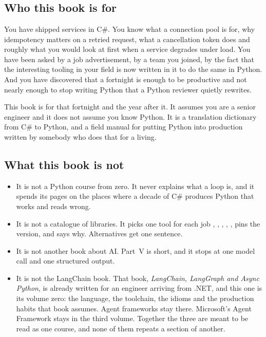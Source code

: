 \chapter*{\lblIntroduction}
{}
\markboth{\lblIntroduction}{\lblIntroduction}

\section*{Who this book is for}

You have shipped services in C\#. You know what a connection pool is for, why
idempotency matters on a retried request, what a cancellation token does and
roughly what you would look at first when a service degrades under load. You
have been asked \dash{} by a job advertisement, by a team you joined, by the
fact that the interesting tooling in your field is now written in it \dash{}
to do the same in Python. And you have discovered that a fortnight is enough to
be productive and not nearly enough to stop writing Python that a Python
reviewer quietly rewrites.

This book is for that fortnight and the year after it. It assumes you are a
senior engineer and it does not assume you know Python. It is a translation
dictionary from C\# to Python, and a field manual for putting Python into
production written by somebody who does that for a living.

\section*{What this book is not}

\begin{itemize}[leftmargin=1.4em]
  \item It is not a Python course from zero. It never explains what a loop is,
        and it spends its pages on the places where a decade of C\# produces
        Python that works and reads wrong.
  \item It is not a catalogue of libraries. It picks one tool for each job
        \dash{} , , , ,
        ,  \dash{} pins the version, and says why.
        Alternatives get one sentence.
  \item It is not another book about AI. Part~V is short, and it stops at one
        model call and one structured output.
  \item It is not the LangChain book. That book, \emph{LangChain, LangGraph and
        Async Python}, is already written for an engineer arriving from .NET,
        and this one is its volume zero: the language, the toolchain, the
        idioms and the production habits that book assumes. Agent frameworks
        stay there. Microsoft's Agent Framework stays in the third volume.
        Together the three are meant to be read as one course, and none of
        them repeats a section of another.
\end{itemize}

